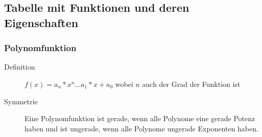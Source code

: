 \documentclass[a4paper]{scrartcl}
\begin{document}
    \subsection{Tabelle mit Funktionen und deren Eigenschaften}
        \subsubsection{Polynomfunktion}        
        \begin{description}
            \item[Definition] $f(x) = a_n*x^n...a_1*x + a_0$ wobei $n$ auch der Grad der Funktion ist
            \item[Symmetrie] Eine Polynomfunktion ist gerade, wenn alle Polynome eine gerade Potenz haben und ist ungerade, wenn alle Polynome ungerade Exponenten haben.
        \end{description}
\end{document}
